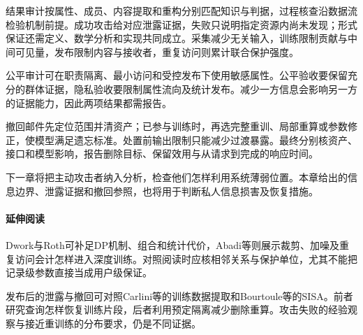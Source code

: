 结果审计按属性、成员、内容提取和重构分别匹配知识与判据，过程核查沿数据流检验机制前提。成功攻击给对应泄露证据，失败只说明指定资源内尚未发现；形式保证还需定义、数学分析和实现共同成立。采集减少无关输入，训练限制贡献与中间可见量，发布限制内容与接收者，重复访问则累计联合保护强度。

公平审计可在职责隔离、最小访问和受控发布下使用敏感属性。公平验收要保留充分的群体证据，隐私验收要限制属性流向及统计发布。减少一方信息会影响另一方的证据能力，因此两项结果都需报告。

撤回邮件先定位范围并清资产；已参与训练时，再选完整重训、局部重算或参数修正，使模型满足遗忘标准。处置前输出限制只能减少过渡暴露。最终分别核资产、接口和模型影响，报告删除目标、保留效用与从请求到完成的响应时间。

下一章将把主动攻击者纳入分析，检查他们怎样利用系统薄弱位置。本章给出的信息边界、泄露证据和撤回参照，也将用于判断私人信息损害及恢复措施。

\paragraph{延伸阅读}

Dwork与Roth可补足DP机制、组合和统计代价，Abadi等则展示裁剪、加噪及重复访问会计怎样进入深度训练。对照阅读时应核相邻关系与保护单位，尤其不能把记录级参数直接当成用户级保证。

发布后的泄露与撤回可对照Carlini等的训练数据提取和Bourtoule等的SISA。前者研究查询怎样恢复训练片段，后者利用预定隔离减少删除重算。攻击失败的经验观察与接近重训练的分布要求，仍是不同证据。
